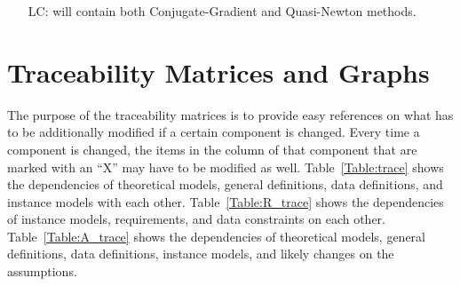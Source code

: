 \documentclass[12pt]{article}
\newcounter{lcnum} %
\begin{document}
\noindent \begin{itemize}

\item[LC\refstepcounter{lcnum}\thelcnum\label{LC_unlikely1}:] will contain both Conjugate-Gradient and Quasi-Newton methods.

\end{itemize}

\section{Traceability Matrices and Graphs}

The purpose of the traceability matrices is to provide easy references on what
has to be additionally modified if a certain component is changed.  Every time a
component is changed, the items in the column of that component that are marked
with an ``X'' may have to be modified as well.  Table~\ref{Table:trace} shows the
dependencies of theoretical models, general definitions, data definitions, and
instance models with each other. Table~\ref{Table:R_trace} shows the
dependencies of instance models, requirements, and data constraints on each
other. Table~\ref{Table:A_trace} shows the dependencies of theoretical models,
general definitions, data definitions, instance models, and likely changes on
the assumptions.



\end{document}
